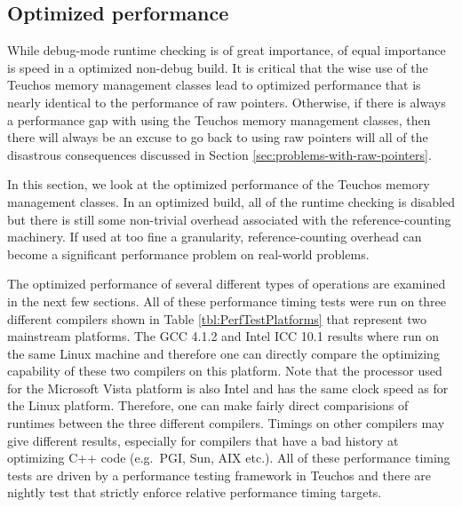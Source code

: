 \documentclass[pdf,ps2pdf,11pt]{SANDreport}
\begin{document}
%
{}\subsection{Optimized performance}
%

While debug-mode runtime checking is of great importance, of equal
importance is speed in a optimized non-debug build.  It is critical
that the wise use of the Teuchos memory management classes lead to
optimized performance that is nearly identical to the performance of
raw pointers.  Otherwise, if there is always a performance gap with
using the Teuchos memory management classes, then there will always be
an excuse to go back to using raw pointers will all of the disastrous
consequences discussed in Section
{}\ref{sec:problems-with-raw-pointers}.

In this section, we look at the optimized performance of the Teuchos
memory management classes.  In an optimized build, all of the runtime
checking is disabled but there is still some non-trivial overhead
associated with the reference-counting machinery.  If used at too fine
a granularity, reference-counting overhead can become a significant
performance problem on real-world problems.

The optimized performance of several different types of operations are
examined in the next few sections.  All of these performance timing
tests were run on three different compilers shown in Table
{}\ref{tbl:PerfTestPlatforms} that represent two mainstream platforms.
The GCC 4.1.2 and Intel ICC 10.1 results where run on the same Linux
machine and therefore one can directly compare the optimizing
capability of these two compilers on this platform.  Note that the
processor used for the Microsoft Vista platform is also Intel and has
the same clock speed as for the Linux platform.  Therefore, one can
make fairly direct comparisions of runtimes between the three
different compilers.  Timings on other compilers may give different
results, especially for compilers that have a bad history at
optimizing C++ code (e.g.\ PGI, Sun, AIX etc.).  All of these
performance timing tests are driven by a performance testing framework
in Teuchos and there are nightly test that strictly enforce relative
performance timing targets.
\end{document}
